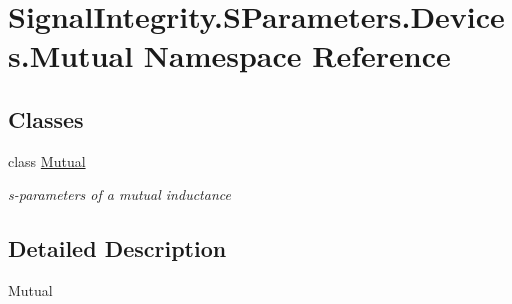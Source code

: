 \hypertarget{namespaceSignalIntegrity_1_1SParameters_1_1Devices_1_1Mutual}{}\section{Signal\+Integrity.\+S\+Parameters.\+Devices.\+Mutual Namespace Reference}
\label{namespaceSignalIntegrity_1_1SParameters_1_1Devices_1_1Mutual}
\subsection*{Classes}
\begin{DoxyCompactItemize}
\item 
class \hyperlink{classSignalIntegrity_1_1SParameters_1_1Devices_1_1Mutual_1_1Mutual}{Mutual}
\begin{DoxyCompactList}\small\item\em s-\/parameters of a mutual inductance \end{DoxyCompactList}\end{DoxyCompactItemize}


\subsection{Detailed Description}
\begin{DoxyVerb}Mutual\end{DoxyVerb}
 